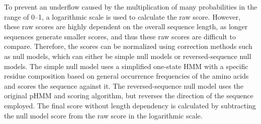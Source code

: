 To prevent an underflow caused by the multiplication of many probabilities in the range of 0--1, a logarithmic scale is used to calculate the raw score. However, these raw scores are highly dependent on the overall sequence length, as longer sequences generate smaller scores, and thus these raw scores are difficult to compare. Therefore, the scores can be normalized using correction methods such as null models, which can either be simple null models or reversed-sequence null models. The simple null model uses a simplified one-state \ac{HMM} with a specific residue composition based on general occurrence frequencies of the amino acids and scores the sequence against it. The reversed-sequence null model uses the original \ac{pHMM} and scoring algorithm, but reverses the direction of the sequence employed. The final score without length dependency is calculated by subtracting the null model score from the raw score in the logarithmic scale.